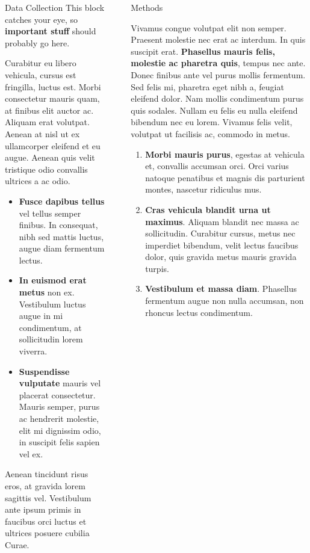 \documentclass[final]{beamer}
\newlength{\sepwidth}
\newlength{\colwidth}
\newcommand{\separatorcolumn}{\begin{column}{\sepwidth}\end{column}}
\begin{document}
\begin{frame}[t]
\begin{columns}[t]
\begin{column}{\colwidth}
\begin{alertblock}{Data Collection}
    This block catches your eye, so \textbf{important stuff} should probably go
    here.

    Curabitur eu libero vehicula, cursus est fringilla, luctus est. Morbi
    consectetur mauris quam, at finibus elit auctor ac. Aliquam erat volutpat.
    Aenean at nisl ut ex ullamcorper eleifend et eu augue. Aenean quis velit
    tristique odio convallis ultrices a ac odio.

    \begin{itemize}
      \item \textbf{Fusce dapibus tellus} vel tellus semper finibus. In
        consequat, nibh sed mattis luctus, augue diam fermentum lectus.
      \item \textbf{In euismod erat metus} non ex. Vestibulum luctus augue in
        mi condimentum, at sollicitudin lorem viverra.
      \item \textbf{Suspendisse vulputate} mauris vel placerat consectetur.
        Mauris semper, purus ac hendrerit molestie, elit mi dignissim odio, in
        suscipit felis sapien vel ex.
    \end{itemize}

    Aenean tincidunt risus eros, at gravida lorem sagittis vel. Vestibulum ante
    ipsum primis in faucibus orci luctus et ultrices posuere cubilia Curae.

  \end{alertblock}

\end{column}

\separatorcolumn

\begin{column}{\colwidth}

  \begin{block}{Methods}

    Vivamus congue volutpat elit non semper. Praesent molestie nec erat ac
    interdum. In quis suscipit erat. \textbf{Phasellus mauris felis, molestie
    ac pharetra quis}, tempus nec ante. Donec finibus ante vel purus mollis
    fermentum. Sed felis mi, pharetra eget nibh a, feugiat eleifend dolor. Nam
    mollis condimentum purus quis sodales. Nullam eu felis eu nulla eleifend
    bibendum nec eu lorem. Vivamus felis velit, volutpat ut facilisis ac,
    commodo in metus.

    \begin{enumerate}
      \item \textbf{Morbi mauris purus}, egestas at vehicula et, convallis
        accumsan orci. Orci varius natoque penatibus et magnis dis parturient
        montes, nascetur ridiculus mus.
      \item \textbf{Cras vehicula blandit urna ut maximus}. Aliquam blandit nec
        massa ac sollicitudin. Curabitur cursus, metus nec imperdiet bibendum,
        velit lectus faucibus dolor, quis gravida metus mauris gravida turpis.
      \item \textbf{Vestibulum et massa diam}. Phasellus fermentum augue non
        nulla accumsan, non rhoncus lectus condimentum.
    \end{enumerate}


\end{block}
\end{column}
\end{columns}
\end{frame}
\end{document}
